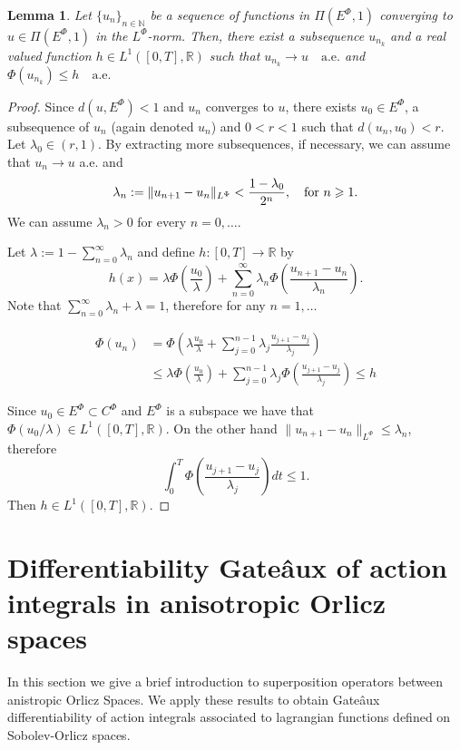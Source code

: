\documentclass[twoside]{article}
\newtheorem{lem}[thm]{Lemma}
\theoremstyle{remark}
\newcommand{\orlnor}{\|_{L^{\Phi}}}
\newcommand{\lphi}{L^{\Phi}}
\newcommand{\ephi}{E^{\Phi}}
\newcommand{\claseor}{C^{\Phi}}
\newcommand{\rr}{\mathbb{R}}
\renewcommand{\leq}{\leqslant}
\renewcommand{\geq}{\geqslant}
\begin{document}
\begin{lem}\label{segundo lema}
Let  $\{{u}_n\}_{n\in \mathbb{N}}$ be a sequence of  functions in $\Pi(\ephi,1)$ converging to  ${u}\in \Pi(\ephi,1)$  in the $\lphi$-norm. Then, there exist a subsequence
${u}_{n_k}$ and a real valued function $h\in L^1([0,T],\rr)$ such that ${u}_{n_k}\rightarrow {u} \quad\text{a.e.}$ and $\Phi({u}_{n_k})\leq h\quad\text{a.e.}$
\end{lem}



\begin{proof}
Since $d({u},\ephi)<1$ and ${u}_n$ converges to ${u}$, there exists $u_0\in\ephi$, a subsequence of $u_n$ (again denoted $u_n$) and $0<r<1$  such that $d(u_n,u_0)<r$. Let $\lambda_0\in (r,1)$.  By extracting more subsequences, if necessary, we can assume that $u_n\to u$ a.e. and
\[\lambda_n:=\|{u}_{n+1}-{u}_{n}\orlnor<\frac{1-\lambda_0}{2^n},\quad\hbox{for } n\geq 1.\]
We can assume $\lambda_n>0$ for every $n=0,\ldots$.

Let $\lambda:=1-\sum_{n=0}^{\infty}\lambda_n$ and define $h:[0,T]\rightarrow\mathbb{R}$  by
\begin{equation}\label{eq:serie} h(x)= \lambda\Phi\left(\frac{u_0}{\lambda}\right)+\sum_{n=0}^{\infty}\lambda_n\Phi\left(\frac{u_{n+1}-u_n}{\lambda_n}\right).
\end{equation}
Note that $\sum_{n=0}^{\infty}\lambda_n+\lambda=1$, therefore for any $n=1,\ldots$


\[
 \begin{split}
   \Phi(u_n) &=\Phi\left(  \lambda\frac{u_0}{\lambda}+   \sum_{j=0}^{n-1}\lambda_j\frac{u_{j+1}-u_j}{\lambda_j} \right)\\
   &\leq
   \lambda\Phi\left(\frac{u_0}{\lambda}\right)+\sum_{j=0}^{n-1}\lambda_j\Phi\left(\frac{u_{j+1}-u_j}{\lambda_j}\right) \leq h
 \end{split}
\]

Since $u_0\in\ephi\subset \claseor$ and $\ephi$ is a subspace we have that $\Phi(u_0/\lambda)\in L^1([0,T],\rr)$. 
On the other hand $\|u_{n+1}-u_n\orlnor \leq \lambda_n$, therefore
\[
 \int_0^T\Phi\left(\frac{u_{j+1}-u_j}{\lambda_j}\right)dt\leq 1.
\]
Then $h\in L^1([0,T],\rr)$.


\end{proof}




\section{Differentiability Gate\^aux of action integrals in anisotropic Orlicz spaces}
In this section we give a brief introduction to superposition operators between anistropic Orlicz Spaces.  
We apply these results to obtain Gate\^aux differentiability of                                                                                action integrals associated to lagrangian functions defined on Sobolev-Orlicz spaces.
\end{document}
